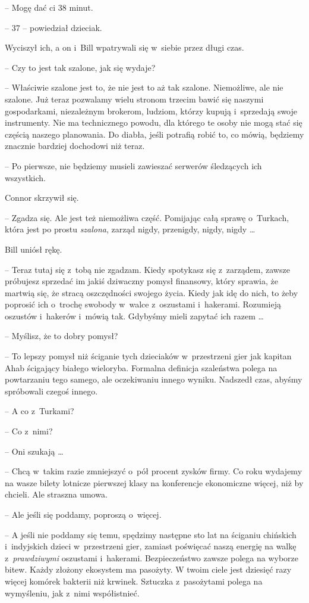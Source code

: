 \documentclass[oneside,polish,11pt,rmheadings]{mwbk}
\begin{document}
-- Mogę dać ci 38 minut. 

-- 37 -- powiedział dzieciak.

Wyciszył ich, a on i~Bill wpatrywali się w~siebie przez długi czas.

-- Czy to jest tak szalone, jak się wydaje? 

-- Właściwie szalone jest to, że nie jest to aż tak szalone. Niemożliwe, ale nie szalone. Już teraz pozwalamy wielu stronom trzecim bawić się naszymi gospodarkami, niezależnym brokerom, ludziom, którzy kupują i~sprzedają swoje instrumenty. Nie ma technicznego powodu, dla którego te osoby nie mogą stać się częścią naszego planowania. Do diabła, jeśli potrafią robić to, co mówią, będziemy znacznie bardziej dochodowi niż teraz.

-- Po pierwsze, nie będziemy musieli zawieszać serwerów śledzących ich wszystkich.

Connor skrzywił się. 

-- Zgadza się. Ale jest też niemożliwa część. Pomijając całą sprawę o~Turkach, która jest po prostu \textit{szalona}, zarząd nigdy, przenigdy, nigdy, nigdy \ldots 

Bill uniósł rękę. 

-- Teraz tutaj się z~tobą nie zgadzam. Kiedy spotykasz się z~zarządem, zawsze próbujesz sprzedać im jakiś dziwaczny pomysł finansowy, który sprawia, że martwią się, że stracą oszczędności swojego życia. Kiedy jak idę do nich, to żeby poprosić ich o~trochę swobody w~walce z~oszustami i~hakerami. Rozumieją oszustów i~hakerów i~mówią tak. Gdybyśmy mieli zapytać ich razem \ldots 

-- Myślisz, że to dobry pomysł?

-- To lepszy pomysł niż ściganie tych dzieciaków w~przestrzeni gier jak kapitan Ahab ścigający białego wieloryba. Formalna definicja szaleństwa polega na powtarzaniu tego samego, ale oczekiwaniu innego wyniku. Nadszedł czas, abyśmy spróbowali czegoś innego.

-- A co z~Turkami?

-- Co z~nimi? 

-- Oni szukają \ldots  

-- Chcą w~takim razie zmniejszyć o~pół procent zysków firmy. Co roku wydajemy na wasze bilety lotnicze pierwszej klasy na konferencje ekonomiczne więcej, niż by chcieli. Ale straszna umowa.

-- Ale jeśli się poddamy, poproszą o~więcej.

-- A jeśli nie poddamy się temu, spędzimy następne sto lat na ściganiu chińskich i~indyjskich dzieci w~przestrzeni gier, zamiast poświęcać naszą energię na walkę z~\textit{prawdziwymi }oszustami i~hakerami. Bezpieczeństwo zawsze polega na wyborze bitew. Każdy złożony ekosystem ma pasożyty. W twoim ciele jest dziesięć razy więcej komórek bakterii niż krwinek. Sztuczka z~pasożytami polega na wymyśleniu, jak z~nimi współistnieć.
\end{document}
